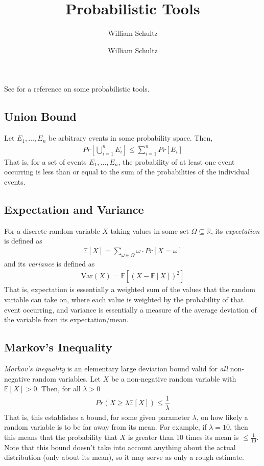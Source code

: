 \documentclass[10pt,a4paper]{article}
\author{William Schultz}
\begin{document}
\title{Probabilistic Tools}
\author{William Schultz}
\maketitle

\newcommand{\expect}[1]{\mathbb{E}\left[#1\right]}
\newcommand{\var}[1]{\text{Var}(#1)}

See \cite{Doerr_2019} for a reference on some probabilistic tools.

\subsection*{Union Bound}

Let $E_1,\dots,E_n$ be arbitrary events in some probability space. Then,
\begin{align*}
    Pr \left[ \bigcup_{i=1}^n E_i \right] \leq \sum_{i=1}^n Pr[E_i]
\end{align*}
That is, for a set of events $E_1,\dots,E_n$, the probability of at least one event occurring is less than or equal to the sum of the probabilities of the individual events.

\subsection*{Expectation and Variance}

For a discrete random variable $X$ taking values in some set $\Omega \subseteq \mathbb{R}$, its \textit{expectation} is defined as
\begin{align*}
    \expect{X} = \sum_{\omega \in \Omega} \omega \cdot Pr\left[X=\omega\right]
\end{align*}
and its \textit{variance} is defined as 
\begin{align*}
    \var{X} = \expect{(X - \expect{X})^2}
\end{align*}
That is, expectation is essentially a weighted sum of the values that the random variable can take on, where each value is weighted by the probability of that event occurring, and variance is essentially a measure of the average deviation of the variable from its expectation/mean.

\subsection*{Markov's Inequality}

\textit{Markov's inequality} is an elementary large deviation bound valid for \textit{all} non-negative random variables. Let $X$ be a non-negative random variable with $\expect{X} > 0$. Then, for all $\lambda > 0$
\begin{align*}
    Pr(X \geq \lambda \expect{X}) \leq \dfrac{1}{\lambda}
\end{align*}
That is, this establishes a bound, for some given parameter $\lambda$, on how likely a random variable is to be far away from its mean. For example, if $\lambda = 10$, then this means that the probability that $X$ is greater than 10 times its mean is $\leq \frac{1}{10}$. Note that this bound doesn't take into account anything about the actual distribution (only about its mean), so it may serve as only a rough estimate.
\end{document}
